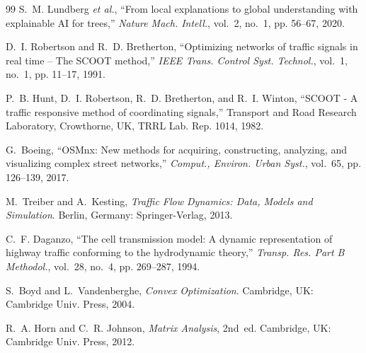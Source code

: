 \documentclass[journal]{IEEEtran}
\begin{document}
\begin{thebibliography}{99}
S.~M. Lundberg \emph{et al.}, ``From local explanations to global understanding with explainable {AI} for trees,'' \emph{Nature Mach. Intell.}, vol.~2, no.~1, pp. 56--67, 2020.

D.~I. Robertson and R.~D. Bretherton, ``Optimizing networks of traffic signals in real time -- The {SCOOT} method,'' \emph{IEEE Trans. Control Syst. Technol.}, vol.~1, no.~1, pp. 11--17, 1991.

P.~B. Hunt, D.~I. Robertson, R.~D. Bretherton, and R.~I. Winton, ``{SCOOT} - A traffic responsive method of coordinating signals,'' Transport and Road Research Laboratory, Crowthorne, UK, TRRL Lab. Rep. 1014, 1982.

G.~Boeing, ``{OSMnx}: New methods for acquiring, constructing, analyzing, and visualizing complex street networks,'' \emph{Comput., Environ. Urban Syst.}, vol.~65, pp. 126--139, 2017.

M.~Treiber and A.~Kesting, \emph{Traffic Flow Dynamics: Data, Models and Simulation}. Berlin, Germany: Springer-Verlag, 2013.

C.~F. Daganzo, ``The cell transmission model: A dynamic representation of highway traffic conforming to the hydrodynamic theory,'' \emph{Transp. Res. Part B Methodol.}, vol.~28, no.~4, pp. 269--287, 1994.

S.~Boyd and L.~Vandenberghe, \emph{Convex Optimization}. Cambridge, UK: Cambridge Univ. Press, 2004.

R.~A. Horn and C.~R. Johnson, \emph{Matrix Analysis}, 2nd~ed. Cambridge, UK: Cambridge Univ. Press, 2012.

\end{thebibliography}
\end{document}
